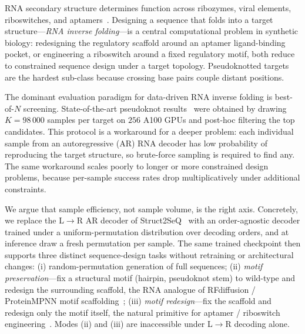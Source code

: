 \documentclass{article}
\begin{document}
RNA secondary structure determines function across ribozymes, viral
elements, riboswitches, and aptamers~\citep{damase2021limitless,
zhang2023lineardesign,wachsmuth2013riboswitch,penchovsky2014review}.
Designing a sequence that folds into a target structure---\emph{RNA
inverse folding}---is a central computational problem in synthetic
biology: redesigning the regulatory scaffold around an aptamer
ligand-binding pocket, or engineering a riboswitch around a fixed
regulatory motif, both reduce to constrained sequence design under a
target topology. Pseudoknotted targets are the hardest sub-class
because crossing base pairs couple distant positions.

The dominant evaluation paradigm for data-driven RNA inverse folding is
best-of-$N$ screening. State-of-the-art pseudoknot
results~\citep{he2026struct2seq} were obtained by drawing $K{=}98\,000$
samples per target on $256$ A100 GPUs and post-hoc filtering the top
candidates. This protocol is a workaround for a deeper problem: each
individual sample from an autoregressive (AR) RNA decoder has low
probability of reproducing the target structure, so brute-force
sampling is required to find any. The same workaround scales poorly to
longer or more constrained design problems, because per-sample success
rates drop multiplicatively under additional constraints.

We argue that sample efficiency, not sample volume, is the right axis.
Concretely, we replace the L$\to$R AR decoder of
Struct2SeQ~\citep{he2026struct2seq} with an order-agnostic decoder
trained under a uniform-permutation distribution over decoding orders,
and at inference draw a fresh permutation per sample. The same trained
checkpoint then supports three distinct sequence-design tasks without
retraining or architectural changes:
(i) random-permutation generation of full sequences;
(ii) \emph{motif preservation}---fix a structural motif (hairpin,
pseudoknot stem) to wild-type and redesign the surrounding scaffold,
the RNA analogue of RFdiffusion / ProteinMPNN motif
scaffolding~\citep{watson2023rfdiffusion,dauparas2022proteinmpnn};
(iii) \emph{motif redesign}---fix the scaffold and redesign only the
motif itself, the natural primitive for aptamer / riboswitch
engineering~\citep{wachsmuth2013riboswitch,penchovsky2014review}.
Modes (ii) and (iii) are inaccessible under L$\to$R decoding alone.
\end{document}
